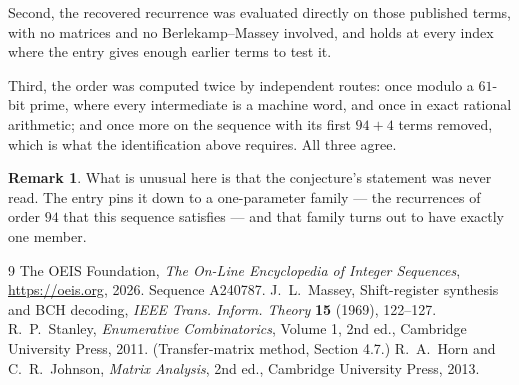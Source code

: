 \documentclass[11pt,a4paper]{article}
\theoremstyle{plain}
\theoremstyle{definition}
\newtheorem{remark}[theorem]{Remark}
\begin{document}
Second, the recovered recurrence was evaluated directly on those published terms, with no
matrices and no Berlekamp--Massey involved, and holds at every index where the entry gives
enough earlier terms to test it.

Third, the order was computed twice by independent routes: once modulo a $61$-bit prime, where
every intermediate is a machine word, and once in exact rational arithmetic; and once more on
the sequence with its first $94+4$ terms removed, which is what the identification above
requires. All three agree.

\begin{remark}
What is unusual here is that the conjecture's statement was never read. The entry pins it down
to a one-parameter family --- the recurrences of order $94$ that this sequence satisfies
--- and that family turns out to have exactly one member.
\end{remark}

\begin{thebibliography}{9}
 The OEIS Foundation, \emph{The On-Line Encyclopedia of Integer
Sequences}, \url{https://oeis.org}, 2026. Sequence A240787.
 J.~L.~Massey, Shift-register synthesis and BCH decoding, \emph{IEEE
Trans. Inform. Theory} \textbf{15} (1969), 122--127.
 R.~P.~Stanley, \emph{Enumerative Combinatorics}, Volume 1, 2nd ed.,
Cambridge University Press, 2011. (Transfer-matrix method, Section 4.7.)
 R.~A.~Horn and C.~R.~Johnson, \emph{Matrix Analysis}, 2nd ed., Cambridge
University Press, 2013.
\end{thebibliography}
\end{document}
